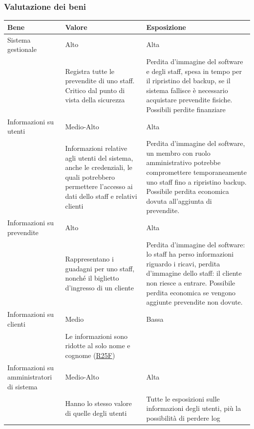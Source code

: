\documentclass[a4paper]{article}
\begin{document}

\subsubsection{Valutazione dei beni}

\begin{center}
    \begin{tabularx}{1\textwidth}{|X|X|X|}
         \hline
         \textbf{Bene} & \textbf{Valore} & \textbf{Esposizione}  \\
         \hline
         \hline
         Sistema gestionale & Alto & Alta \\
                            & Registra tutte le prevendite di uno staff. Critico dal punto di vista della sicurezza & Perdita d'immagine del software e degli staff, spesa in tempo per il ripristino del backup, se il sistema fallisce è necessario acquistare prevendite fisiche. Possibili perdite finanziare \\
         \hline
         Informazioni su utenti & Medio-Alto & Alta\\
                            & Informazioni relative agli utenti del sistema, anche le credenziali, le quali potrebbero permettere l'accesso ai dati dello staff e relativi clienti & Perdita d'immagine del software, un membro con ruolo amministrativo potrebbe compromettere temporaneamente uno staff fino a ripristino backup. Possibile perdita economica dovuta all'aggiunta di prevendite.\\
         \hline
         Informazioni su prevendite & Alto & Alta \\
                                    & Rappresentano i guadagni per uno staff, nonché il biglietto d'ingresso di un cliente & Perdita d'immagine del software: lo staff ha perso informazioni riguardo i ricavi, perdita d'immagine dello staff: il cliente non riesce a entrare. Possibile perdita economica se vengono aggiunte prevendite non dovute.\\
         \hline
         Informazioni su clienti & Medio & Bassa \\
                                  & Le informazioni sono ridotte al solo nome e cognome (\hyperlink{R25F}{R25F}) & \\
         \hline
         Informazioni su amministratori di sistema & Medio-Alto &  Alta \\
                                                    & Hanno lo stesso valore di quelle degli utenti & Tutte le esposizioni sulle informazioni degli utenti, più la possibilità di perdere log\\ 
         \hline
    \end{tabularx}
\end{center}
\end{document}
